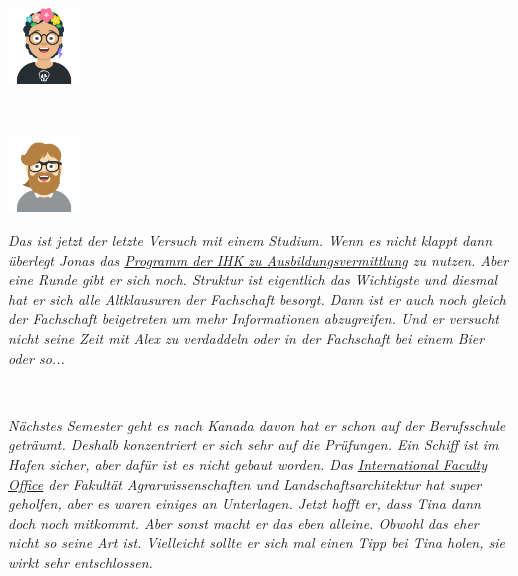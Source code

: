 \documentclass[a4paper, 9pt]{scrartcl}\usepackage[]{graphicx}\usepackage[]{xcolor}
\begin{document}
\begin{minipage}[c]{0.125\textwidth}
\includegraphics[width = 1.9cm]{avatare/Jessica}
\end{minipage}\\[2.75Ex]
\begin{minipage}[c]{0.125\textwidth}
\includegraphics[width = 1.9cm]{avatare/Jonas}
\end{minipage}
\begin{minipage}[c]{0.875\textwidth}
\textit{Das ist jetzt der letzte Versuch mit einem Studium. Wenn es nicht klappt dann überlegt Jonas das \href{https://www.ihk.de/osnabrueck/aus-und-weiterbildung/ausbildung/ausbildungsbetriebe/projekt-neustart-1087206}{Programm der IHK zu Ausbildungsvermittlung} zu nutzen. Aber eine Runde gibt er sich noch. Struktur ist eigentlich das Wichtigste und diesmal hat er sich alle Altklausuren der Fachschaft besorgt. Dann ist er auch noch gleich der Fachschaft beigetreten um mehr Informationen abzugreifen. Und er versucht nicht seine Zeit mit Alex zu verdaddeln oder in der Fachschaft bei einem Bier oder so...}
\end{minipage}\\[2.75Ex]
\begin{minipage}[c]{0.875\textwidth}
\textit{Nächstes Semester geht es nach Kanada davon hat er schon auf der Berufsschule geträumt. Deshalb konzentriert er sich sehr auf die Prüfungen. Ein Schiff ist im Hafen sicher, aber dafür ist es nicht gebaut worden. Das \href{https://www.hs-osnabrueck.de/wir/fakultaeten/aul/international/}{International Faculty Office} der Fakultät Agrarwissenschaften und Landschaftsarchitektur hat super geholfen, aber es waren einiges an Unterlagen. Jetzt hofft er, dass Tina dann doch noch mitkommt. Aber sonst macht er das eben alleine. Obwohl das eher nicht so seine Art ist. Vielleicht sollte er sich mal einen Tipp bei Tina holen, sie wirkt sehr entschlossen.} 
\end{minipage}
\end{document}

